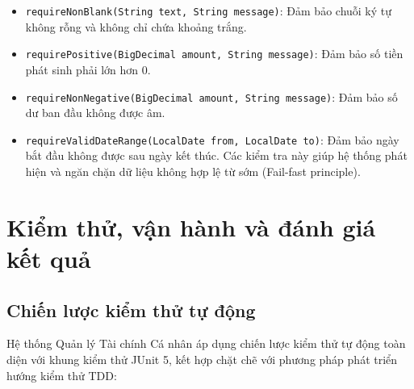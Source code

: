 \documentclass[a4paper,12pt]{report}
\providecommand{\tightlist}{%
  \setlength{\itemsep}{0pt}\setlength{\parskip}{0pt}}
\newcommand{\passthrough}[1]{#1}
\begin{document}
\begin{itemize}
\tightlist
\item
  \passthrough{\lstinline!requireNonBlank(String text, String message)!}:
  Đảm bảo chuỗi ký tự không rỗng và không chỉ chứa khoảng trắng.
\item
  \passthrough{\lstinline!requirePositive(BigDecimal amount, String message)!}:
  Đảm bảo số tiền phát sinh phải lớn hơn 0.
\item
  \passthrough{\lstinline!requireNonNegative(BigDecimal amount, String message)!}:
  Đảm bảo số dư ban đầu không được âm.
\item
  \passthrough{\lstinline!requireValidDateRange(LocalDate from, LocalDate to)!}:
  Đảm bảo ngày bắt đầu không được sau ngày kết thúc. Các kiểm tra này
  giúp hệ thống phát hiện và ngăn chặn dữ liệu không hợp lệ từ sớm
  (Fail-fast principle).
\end{itemize}

\chapter{Kiểm thử, vận hành và đánh giá kết
quả}\label{kiux1ec3m-thux1eed-vux1eadn-huxe0nh-vuxe0-ux111uxe1nh-giuxe1-kux1ebft-quux1ea3}

\section{Chiến lược kiểm thử tự
động}\label{chiux1ebfn-lux1b0ux1ee3c-kiux1ec3m-thux1eed-tux1ef1-ux111ux1ed9ng}

Hệ thống Quản lý Tài chính Cá nhân áp dụng chiến lược kiểm thử tự động
toàn diện với khung kiểm thử JUnit 5, kết hợp chặt chẽ với phương pháp
phát triển hướng kiểm thử TDD:
\end{document}
